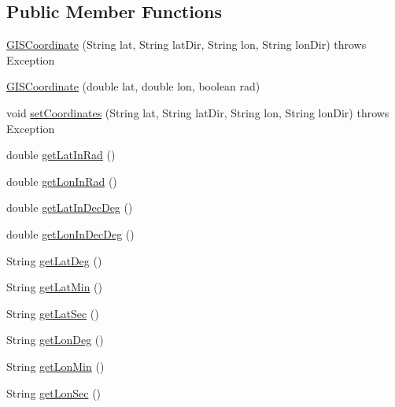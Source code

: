 \subsection*{Public Member Functions}
\begin{DoxyCompactItemize}
\item 
\hyperlink{classpt_1_1lsts_1_1asa_1_1pos_1_1GISCoordinate_a0b580a85ae606e106642bd786dd2c923}{G\+I\+S\+Coordinate} (String lat, String lat\+Dir, String lon, String lon\+Dir)  throws Exception 
\item 
\hyperlink{classpt_1_1lsts_1_1asa_1_1pos_1_1GISCoordinate_ad824a4d6ae8e44d5d151600b8fc59f0d}{G\+I\+S\+Coordinate} (double lat, double lon, boolean rad)
\item 
void \hyperlink{classpt_1_1lsts_1_1asa_1_1pos_1_1GISCoordinate_af6affc1d0f9f67f3ebf28e3e73a76fb5}{set\+Coordinates} (String lat, String lat\+Dir, String lon, String lon\+Dir)  throws Exception 
\item 
double \hyperlink{classpt_1_1lsts_1_1asa_1_1pos_1_1GISCoordinate_af7804765a7eae34d76b2fa8ae7d191ee}{get\+Lat\+In\+Rad} ()
\item 
double \hyperlink{classpt_1_1lsts_1_1asa_1_1pos_1_1GISCoordinate_aec186d422be6b521d75f5c0a1717bbcf}{get\+Lon\+In\+Rad} ()
\item 
double \hyperlink{classpt_1_1lsts_1_1asa_1_1pos_1_1GISCoordinate_ad1d54db96b75e80cca8e77fa3da817f5}{get\+Lat\+In\+Dec\+Deg} ()
\item 
double \hyperlink{classpt_1_1lsts_1_1asa_1_1pos_1_1GISCoordinate_a5df72aac2594ba2e2c6793f421b442bb}{get\+Lon\+In\+Dec\+Deg} ()
\item 
String \hyperlink{classpt_1_1lsts_1_1asa_1_1pos_1_1GISCoordinate_a05a450020510e8144b034bb9f18938c5}{get\+Lat\+Deg} ()
\item 
String \hyperlink{classpt_1_1lsts_1_1asa_1_1pos_1_1GISCoordinate_ab80f872cfaa06d6d455edbf51e5f8726}{get\+Lat\+Min} ()
\item 
String \hyperlink{classpt_1_1lsts_1_1asa_1_1pos_1_1GISCoordinate_a63bfcf08a13e63333ba34d0ee63619dc}{get\+Lat\+Sec} ()
\item 
String \hyperlink{classpt_1_1lsts_1_1asa_1_1pos_1_1GISCoordinate_a53423dbf165a762c9972a71e7d31797b}{get\+Lon\+Deg} ()
\item 
String \hyperlink{classpt_1_1lsts_1_1asa_1_1pos_1_1GISCoordinate_ad69b22202d094d3edf51b734ae5264b4}{get\+Lon\+Min} ()
\item 
String \hyperlink{classpt_1_1lsts_1_1asa_1_1pos_1_1GISCoordinate_a0c68d58aadb7fe9f1a5a3be143656e01}{get\+Lon\+Sec} ()

\end{DoxyCompactItemize}
